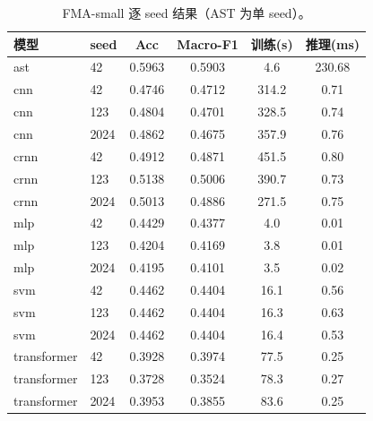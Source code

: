 \begin{table}[H]
\centering\scriptsize
\caption{FMA-small 逐 seed 结果（AST 为单 seed）。}
\label{tab:fma-perseed}
\begin{tabular}{llcccc}
\toprule
模型 & seed & Acc & Macro-F1 & 训练(s) & 推理(ms)\\
\midrule
ast & 42 & 0.5963 & 0.5903 & 4.6 & 230.68\\
cnn & 42 & 0.4746 & 0.4712 & 314.2 & 0.71\\
cnn & 123 & 0.4804 & 0.4701 & 328.5 & 0.74\\
cnn & 2024 & 0.4862 & 0.4675 & 357.9 & 0.76\\
crnn & 42 & 0.4912 & 0.4871 & 451.5 & 0.80\\
crnn & 123 & 0.5138 & 0.5006 & 390.7 & 0.73\\
crnn & 2024 & 0.5013 & 0.4886 & 271.5 & 0.75\\
mlp & 42 & 0.4429 & 0.4377 & 4.0 & 0.01\\
mlp & 123 & 0.4204 & 0.4169 & 3.8 & 0.01\\
mlp & 2024 & 0.4195 & 0.4101 & 3.5 & 0.02\\
svm & 42 & 0.4462 & 0.4404 & 16.1 & 0.56\\
svm & 123 & 0.4462 & 0.4404 & 16.3 & 0.63\\
svm & 2024 & 0.4462 & 0.4404 & 16.4 & 0.53\\
transformer & 42 & 0.3928 & 0.3974 & 77.5 & 0.25\\
transformer & 123 & 0.3728 & 0.3524 & 78.3 & 0.27\\
transformer & 2024 & 0.3953 & 0.3855 & 83.6 & 0.25\\
\bottomrule
\end{tabular}
\end{table}
